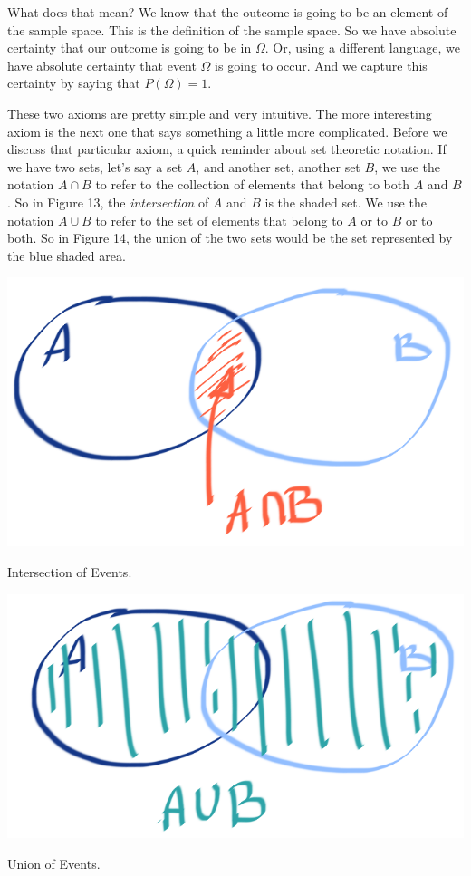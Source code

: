 \documentclass{tufte-handout}
\begin{document}
What does that mean? We know that the outcome is going to be an element of the sample space. This
is the definition of the sample space. So we have absolute certainty that our outcome is going to be in
$\Omega$. Or, using a different language, we have absolute certainty that event $\Omega$ is going to 
occur. And we capture this certainty by saying that $P(\Omega) = 1$.


These two axioms are pretty simple and very intuitive. The more interesting axiom is the next one that
says something a little more complicated. Before we discuss that particular axiom, a quick reminder
about set theoretic notation. If we have two sets, let's say a set $A$, and another set, another set $B$, we
use the notation $A \cap B$ to refer to the collection of elements
that belong to both $A$ and $B$. So in Figure 13, the \emph{intersection} of $A$ and $B$ is the shaded set. We use
the notation $A \cup B$ to refer to the set of elements that belong to $A$ or to $B$ or to
both. So in Figure 14, the union of the two sets would be the set represented by the blue shaded area.
\begin{marginfigure}
  \includegraphics[width=\linewidth]{Intersection}
  \caption{Intersection of Events.}
\end{marginfigure}

\begin{marginfigure}
  \includegraphics[width=\linewidth]{Union}
  \caption{Union of Events.}
\end{marginfigure}
\end{document}
